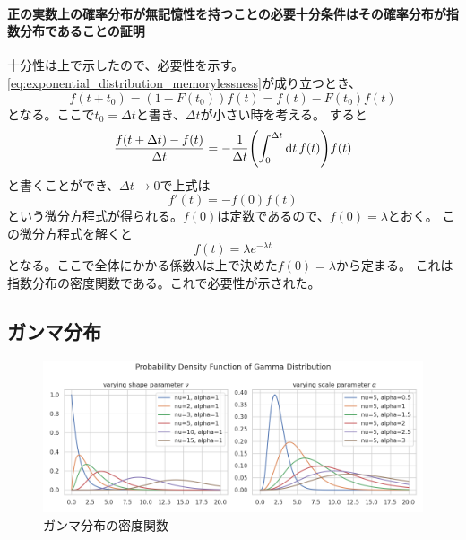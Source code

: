 \paragraph{正の実数上の確率分布が無記憶性を持つことの必要十分条件はその確率分布が指数分布であることの証明}
十分性は上で示したので、必要性を示す。
\cref{eq:exponential_distribution_memorylessness}が成り立つとき、
\begin{equation}
  f(t + t_0) = (1 - F(t_0)) f(t) = f(t) - F(t_0) f(t)
\end{equation}
となる。ここで\(t_0 = \Delta t\)と書き、\(\Delta t\)が小さい時を考える。
すると
\begin{equation}
  \frac{f(t + \Delta t) - f(t)}{\Delta t} =
   - \frac{1}{\Delta t} \qty ( \int_{0}^{\Delta t} \dd{t} f(t)) f(t)
\end{equation}
と書くことができ、\(\Delta t \rightarrow 0\)で上式は
\begin{equation}
  f'(t) = - f(0) f(t)
\end{equation}
という微分方程式が得られる。\(f(0)\)は定数であるので、\(f(0)=\lambda\)とおく。
この微分方程式を解くと
\begin{equation}
  f(t) = \lambda e^{- \lambda t}
\end{equation}
となる。ここで全体にかかる係数\(\lambda\)は上で決めた\(f(0)=\lambda\)から定まる。
これは指数分布の密度関数である。これで必要性が示された。

\subsection{ガンマ分布}

\begin{figure}[htbp]
  \centering
  \includegraphics[width=15cm]{figures/gamma_pdf.png}
  \caption{ガンマ分布の密度関数}
\end{figure}


